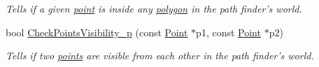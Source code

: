 \begin{DoxyCompactItemize}
\begin{DoxyCompactList}\small\item\em Tells if a given \hyperlink{structPathFinder_1_1Point}{point} is inside any \hyperlink{structPathFinder_1_1ConvexPolygon}{polygon} in the path finder's world. \item\end{DoxyCompactList}\item 
bool \hyperlink{classPathFinder_a12fb7b7f54766d8bbf5753a5a036a5f0}{CheckPointsVisibility\_\-p} (const \hyperlink{structPathFinder_1_1Point}{Point} $\ast$p1, const \hyperlink{structPathFinder_1_1Point}{Point} $\ast$p2)
\begin{DoxyCompactList}\small\item\em Tells if two \hyperlink{structPathFinder_1_1Point}{points} are visible from each other in the path finder's world. \item\end{DoxyCompactList}\end{DoxyCompactItemize}
